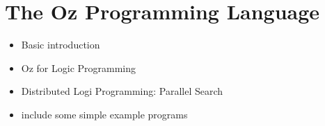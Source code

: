 \section{The Oz Programming Language}

\begin{itemize}
\item Basic introduction \cite{vanroy99mozart}
\item Oz for Logic Programming \cite{vanroy03mozart_logic}
\item Distributed Logi Programming: Parallel Search \cite{schulte00oz_parallel}
\item include some simple example programs
\end{itemize}

